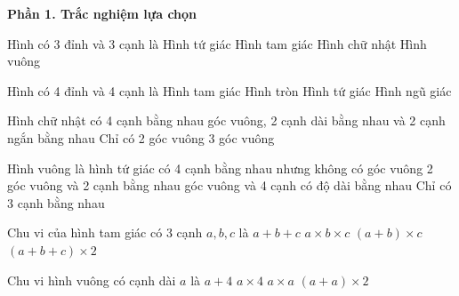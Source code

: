 \textbf{Phần 1. Trắc nghiệm lựa chọn}

\begin{ex} %
Hình có 3 đỉnh và 3 cạnh là
\choice
{Hình tứ giác}
{\True Hình tam giác}
{Hình chữ nhật}
{Hình vuông}
\end{ex}

\begin{ex} %
Hình có 4 đỉnh và 4 cạnh là
\choice
{Hình tam giác}
{Hình tròn}
{\True Hình tứ giác}
{Hình ngũ giác}
\end{ex}

\begin{ex} %
Hình chữ nhật có
\choice
{4 cạnh bằng nhau}
{ góc vuông, 2 cạnh dài bằng nhau và 2 cạnh ngắn bằng nhau}
{Chỉ có 2 góc vuông}
{3 góc vuông}
\end{ex}

\begin{ex} %
Hình vuông là hình tứ giác có
\choice
{4 cạnh bằng nhau nhưng không có góc vuông}
{2 góc vuông và 2 cạnh bằng nhau}
{ góc vuông và 4 cạnh có độ dài bằng nhau}
{Chỉ có 3 cạnh bằng nhau}
\end{ex}

\begin{ex} %
Chu vi của hình tam giác có 3 cạnh $a, b, c$ là
\choice
{\True $a + b + c$}
{$a \times b \times c$}
{$(a + b) \times c$}
{$(a + b + c) \times 2$}
\end{ex}

\begin{ex} %
Chu vi hình vuông có cạnh dài $a$ là
\choice
{$a + 4$}
{\True $a \times 4$}
{$a \times a$}
{$(a + a) \times 2$}
\end{ex}

